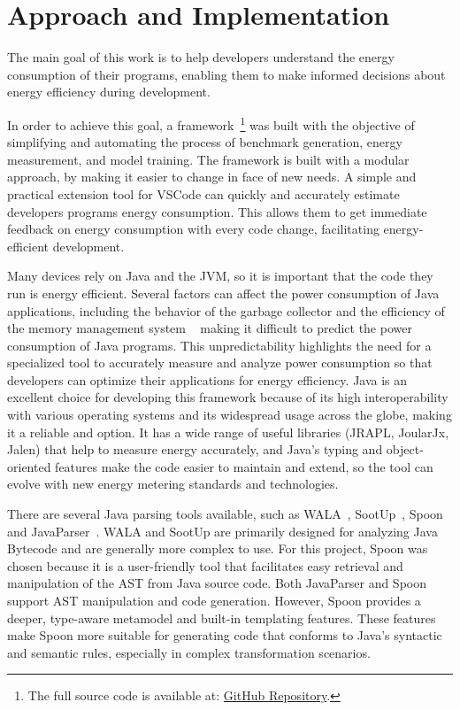 \chapter{Approach and Implementation}\label{chapter:approach}



The main goal of this work is to help developers understand the energy consumption of their programs, enabling them to make informed decisions about energy efficiency during development.

In order to achieve this goal, a framework~\footnote{The full source code is available at: \href{https://github.com/afonsoCarreira1/EnergyAwareProgramming}{GitHub Repository}.} was built with the objective of simplifying and automating the process of benchmark generation, energy measurement, and model training. The framework is built with a modular approach, by making it easier to change in face of new needs. A simple and practical extension tool for VSCode  can quickly and accurately estimate developers programs energy consumption. This allows them to get immediate feedback on energy consumption with every code change, facilitating energy-efficient development.




Many devices rely on Java and the JVM, so it is important that the code they run is energy efficient. Several factors can affect the power consumption of Java applications, including the behavior of the garbage collector and the efficiency of the memory management system ~\cite{10.5555/1267847.1267870} making it difficult to predict the power consumption of Java programs. This unpredictability highlights the need for a specialized tool to accurately measure and analyze power consumption so that developers can optimize their applications for energy efficiency.
Java is an excellent choice for developing this framework because of its high interoperability with various operating systems and its widespread usage across the globe, making it a reliable and option. It has a wide range of useful libraries (JRAPL, JoularJx, Jalen) that help to measure energy accurately, and Java's typing and object-oriented features make the code easier to maintain and extend, so the tool can evolve with new energy metering standards and technologies.

There are several Java parsing tools available, such as WALA~\cite{wala_main}, SootUp~\cite{sootup_main}, Spoon~\cite{spoon_main} and JavaParser~\cite{javaParser}. WALA and SootUp are primarily designed for analyzing Java Bytecode and are generally more complex to use. For this project, Spoon was chosen because it is a user-friendly tool that facilitates easy retrieval and manipulation of the AST from Java source code. Both JavaParser and Spoon support AST manipulation and code generation. However, Spoon provides a deeper, type-aware metamodel and built-in templating features. These features make Spoon more suitable for generating code that conforms to Java’s syntactic and semantic rules, especially in complex transformation scenarios.


